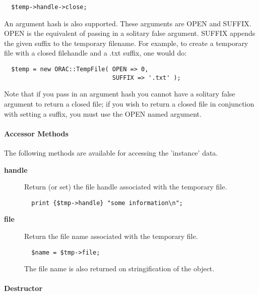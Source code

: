 \begin{description}
\begin{description}
\begin{verbatim}
  $temp->handle->close;
\end{verbatim}


An argument hash is also supported. These arguments are OPEN and
SUFFIX. OPEN is the equivalent of passing in a solitary false
argument. SUFFIX appends the given suffix to the temporary
filename. For example, to create a temporary file with a closed
filehandle and a .txt suffix, one would do:

\begin{verbatim}
  $temp = new ORAC::TempFile( OPEN => 0,
                              SUFFIX => '.txt' );
\end{verbatim}


Note that if you pass in an argument hash you cannot have a solitary
false argument to return a closed file; if you wish to return a closed
file in conjunction with setting a suffix, you must use the OPEN named
argument.

\end{description}
\paragraph*{Accessor Methods\label{ORAC::TempFile_Accessor_Methods}}


The following methods are available for accessing the 
'instance' data.

\begin{description}

\item[{\textbf{handle}}] \mbox{}

Return (or set) the file handle associated with the temporary 
file.

\begin{verbatim}
  print {$tmp->handle} "some information\n";
\end{verbatim}

\item[{\textbf{file}}] \mbox{}

Return the file name associated with the temporary file.

\begin{verbatim}
  $name = $tmp->file;
\end{verbatim}


The file name is also returned on stringification of the object.

\end{description}
\paragraph*{Destructor\label{ORAC::TempFile_Destructor}}



\end{description}
